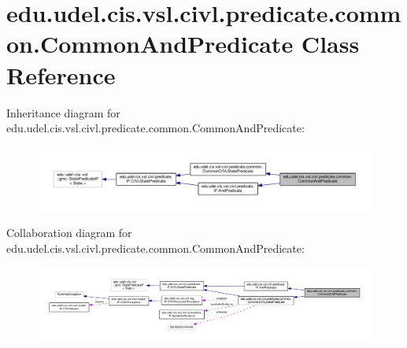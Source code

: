 \hypertarget{classedu_1_1udel_1_1cis_1_1vsl_1_1civl_1_1predicate_1_1common_1_1CommonAndPredicate}{}\section{edu.\+udel.\+cis.\+vsl.\+civl.\+predicate.\+common.\+Common\+And\+Predicate Class Reference}
\label{classedu_1_1udel_1_1cis_1_1vsl_1_1civl_1_1predicate_1_1common_1_1CommonAndPredicate}


Inheritance diagram for edu.\+udel.\+cis.\+vsl.\+civl.\+predicate.\+common.\+Common\+And\+Predicate\+:
\nopagebreak
\begin{figure}[H]
\begin{center}
\leavevmode
\includegraphics[width=350pt]{classedu_1_1udel_1_1cis_1_1vsl_1_1civl_1_1predicate_1_1common_1_1CommonAndPredicate__inherit__graph}
\end{center}
\end{figure}


Collaboration diagram for edu.\+udel.\+cis.\+vsl.\+civl.\+predicate.\+common.\+Common\+And\+Predicate\+:
\nopagebreak
\begin{figure}[H]
\begin{center}
\leavevmode
\includegraphics[width=350pt]{classedu_1_1udel_1_1cis_1_1vsl_1_1civl_1_1predicate_1_1common_1_1CommonAndPredicate__coll__graph}
\end{center}
\end{figure}
